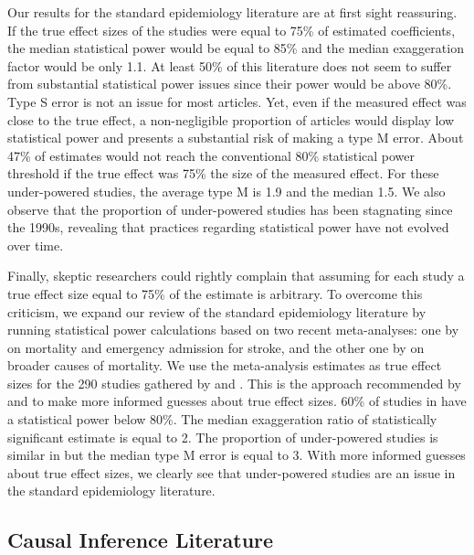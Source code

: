 \documentclass[12pt]{article}
\begin{document}
        Our results for the standard epidemiology literature are at first sight reassuring. If the true effect sizes of the studies were equal to 75\% of estimated coefficients, the median statistical power would be equal to 85\% and the median exaggeration factor would be only 1.1. At least 50\% of this literature does not seem to suffer from substantial statistical power issues since their power would be above 80\%. Type S error is not an issue for most articles. Yet, even if the measured effect was close to the true effect, a non-negligible proportion of articles would display low statistical power and presents a substantial risk of making a type M error. About 47\% of estimates would not reach the conventional 80\% statistical power threshold if the true effect was 75\% the size of the measured effect. For these under-powered studies, the average type M is 1.9 and the median 1.5. We also observe that the proportion of under-powered studies has been stagnating since the 1990s, revealing that practices regarding statistical power have not evolved over time.
        
        Finally, skeptic researchers could rightly complain that assuming for each study a true effect size equal to 75\% of the estimate is arbitrary. To overcome this criticism, we expand our review of the standard epidemiology literature by running statistical power calculations based on two recent meta-analyses: one by \cite{shah2015short} on mortality and emergency admission for stroke, and the other one by \cite{orellano2020short} on broader causes of mortality. We use the meta-analysis estimates as true effect sizes for the 290 studies gathered by \cite{shah2015short} and \citep{orellano2020short}. This is the approach recommended by \cite{gelman_beyond_2014} and \cite{ioannidis_power_2017} to make more informed guesses about true effect sizes. 60\% of studies in \cite{orellano2020short} have a statistical power below 80\%. The median exaggeration ratio of statistically significant estimate is equal to 2. The proportion of under-powered studies is similar in \cite{shah2015short} but the median type M error is equal to 3. With more informed guesses about true effect sizes, we clearly see that under-powered studies are an issue in the standard epidemiology literature.
        
    \subsection{Causal Inference Literature}
    
\end{document}
